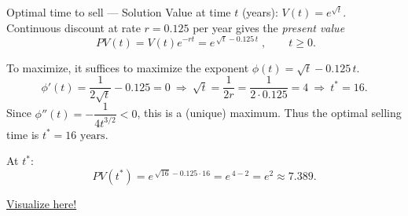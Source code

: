 \documentclass[9pt]{beamer}
\begin{document}
\begin{frame}{Optimal time to sell — Solution}
Value at time $t$ (years): $V(t)=e^{\sqrt{t}}$. Continuous discount at rate $r=0.125$ per year gives the \emph{present value}
\[
\boxed{\;PV(t)=V(t)e^{-rt}=e^{\,\sqrt{t}-0.125\,t}\;},\qquad t\ge 0.
\]

To maximize, it suffices to maximize the exponent $\phi(t)=\sqrt{t}-0.125\,t$.
\[
\phi'(t)=\frac{1}{2\sqrt{t}}-0.125=0 \ \Longrightarrow\ \sqrt{t}=\frac{1}{2r}=\frac{1}{2\cdot0.125}=4
\ \Longrightarrow\ \boxed{t^*=16}.
\]
Since $\phi''(t)=-\dfrac{1}{4t^{3/2}}<0$, this is a (unique) maximum.  
Thus the optimal selling time is \(\boxed{t^*=16\text{ years}}\).

At $t^*$:
\[
PV(t^*)=e^{\,\sqrt{16}-0.125\cdot 16}=e^{\,4-2}=\boxed{e^{2}\approx 7.389}.%
\]
\vspace{-0.1cm}

\begin{center}
\href{https://www.desmos.com/calculator/p10x6agsjc}{Visualize here!}    
\end{center}


\end{frame}



\end{document}
